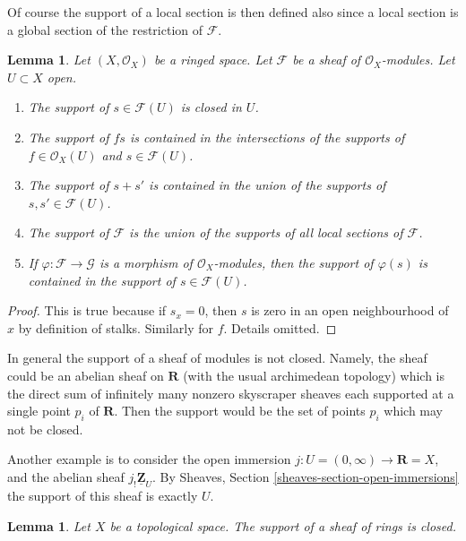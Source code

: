 \documentclass{stacks-project}
\theoremstyle{plain}
\newtheorem{lemma}[subsection]{Lemma}
\theoremstyle{definition}
\theoremstyle{remark}
\numberwithin{equation}{subsection}
\begin{document}
\noindent
Of course the support of a local section is then defined also
since a local section is a global section of the restriction of
$\mathcal{F}$.

\begin{lemma}
\label{lemma-support-section-closed}
Let $(X, \mathcal{O}_X)$ be a ringed space.
Let $\mathcal{F}$ be a sheaf of $\mathcal{O}_X$-modules.
Let $U \subset X$ open.
\begin{enumerate}
\item The support of $s \in \mathcal{F}(U)$ is closed in $U$.
\item The support of $fs$ is contained in the intersections
of the supports of $f \in \mathcal{O}_X(U)$ and $s \in \mathcal{F}(U)$.
\item The support of $s + s'$ is contained in the union of
the supports of $s, s' \in \mathcal{F}(U)$.
\item The support of $\mathcal{F}$ is the union of the supports
of all local sections of $\mathcal{F}$.
\item If $\varphi : \mathcal{F} \to \mathcal{G}$ is a morphism of
$\mathcal{O}_X$-modules, then the support of $\varphi(s)$ is
contained in the support of $s \in \mathcal{F}(U)$.
\end{enumerate}
\end{lemma}

\begin{proof}
This is true because if $s_x = 0$, then $s$ is zero
in an open neighbourhood of $x$ by definition of stalks.
Similarly for $f$. Details omitted.
\end{proof}

\noindent
In general the support of a sheaf of modules is not closed.
Namely, the sheaf could be an abelian sheaf on $\mathbf{R}$
(with the usual archimedean topology)
which is the direct sum of infinitely many nonzero skyscraper
sheaves each supported at a single point $p_i$ of $\mathbf{R}$.
Then the support would be the set of points $p_i$
which may not be closed.

\medskip\noindent
Another example is to consider the open immersion
$j : U = (0 , \infty) \to \mathbf{R} = X$, and the abelian sheaf
$j_!\underline{\mathbf{Z}}_U$. By Sheaves, Section
\ref{sheaves-section-open-immersions} the support of
this sheaf is exactly $U$.

\begin{lemma}
\label{lemma-support-sheaf-rings-closed}
Let $X$ be a topological space.
The support of a sheaf of rings is closed.
\end{lemma}
\end{document}
